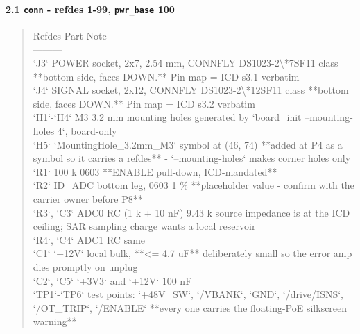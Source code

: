 \documentclass[11pt,a4paper]{article}
\begin{document}
\paragraph*{2.1 \texttt{conn} - refdes 1-99, \texttt{pwr\_base} 100}
\begin{quote}\small\ttfamily\raggedright
\textbar{} Refdes \textbar{} Part \textbar{} Note \textbar{}\\
\textbar{}---\textbar{}---\textbar{}---\textbar{}\\
\textbar{} `J3` \textbar{} POWER socket, 2x7, 2.54 mm, CONNFLY DS1023-2\textbackslash{}{*}7SF11 class \textbar{} {*}{*}bottom side, faces DOWN.{*}{*} Pin map = ICD s3.1 verbatim \textbar{}\\
\textbar{} `J4` \textbar{} SIGNAL socket, 2x12, CONNFLY DS1023-2\textbackslash{}{*}12SF11 class \textbar{} {*}{*}bottom side, faces DOWN.{*}{*} Pin map = ICD s3.2 verbatim \textbar{}\\
\textbar{} `H1`-`H4` \textbar{} M3 3.2 mm mounting holes \textbar{} generated by `board\_init --mounting-holes 4`, board-only \textbar{}\\
\textbar{} `H5` \textbar{} `MountingHole\_3.2mm\_M3` symbol at (46, 74) \textbar{} {*}{*}added at P4 as a symbol so it carries a refdes{*}{*} - `--mounting-holes` makes corner holes only \textbar{}\\
\textbar{} `R1` \textbar{} 100 k 0603 \textbar{} {*}{*}ENABLE pull-down, ICD-mandated{*}{*} \textbar{}\\
\textbar{} `R2` \textbar{} ID\_ADC bottom leg, 0603 1 \% \textbar{} {*}{*}placeholder value - confirm with the carrier owner before P8{*}{*} \textbar{}\\
\textbar{} `R3`, `C3` \textbar{} ADC0 RC (1 k + 10 nF) \textbar{} 9.43 k source impedance is at the ICD ceiling; SAR sampling charge wants a local reservoir \textbar{}\\
\textbar{} `R4`, `C4` \textbar{} ADC1 RC \textbar{} same \textbar{}\\
\textbar{} `C1` \textbar{} `+12V` local bulk, {*}{*}\textless{}= 4.7 uF{*}{*} \textbar{} deliberately small so the error amp dies promptly on unplug \textbar{}\\
\textbar{} `C2`, `C5` \textbar{} `+3V3` and `+12V` 100 nF \textbar{} \textbar{}\\
\textbar{} `TP1`-`TP6` \textbar{} test points: `+48V\_SW`, `/VBANK`, `GND`, `/drive/ISNS`, `/OT\_TRIP`, `/ENABLE` \textbar{} {*}{*}every one carries the floating-PoE silkscreen warning{*}{*} \textbar{}
\end{quote}
\end{document}
